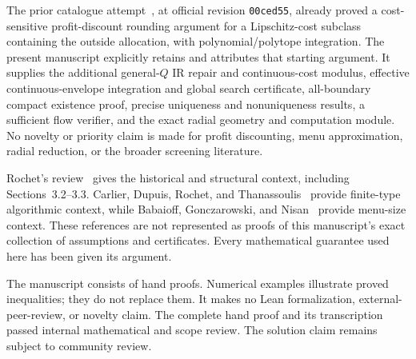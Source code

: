 \documentclass[11pt,a4paper]{article}
\numberwithin{equation}{section}
\begin{document}
The prior catalogue attempt~\cite{PriorAttempt}, at official revision
\texttt{00ced55}, already proved a cost-sensitive profit-discount
rounding argument for a Lipschitz-cost subclass containing the outside
allocation, with polynomial/polytope integration.
The present manuscript explicitly retains and attributes that starting
argument. It supplies the additional general-\(Q\) IR repair and
continuous-cost modulus, effective continuous-envelope integration and
global search certificate, all-boundary compact existence proof,
precise uniqueness and nonuniqueness results, a sufficient flow
verifier, and the exact radial geometry and computation module.
No novelty or priority claim is made for profit discounting, menu
approximation, radial reduction, or the broader screening literature.

Rochet's review~\cite{Rochet2024} gives the historical and structural
context, including Sections~3.2--3.3.
Carlier, Dupuis, Rochet, and Thanassoulis~\cite{CDRT2024} provide
finite-type algorithmic context, while
Babaioff, Gonczarowski, and Nisan~\cite{BGN} provide menu-size context.
These references are not represented as proofs of this manuscript's
exact collection of assumptions and certificates.
Every mathematical guarantee used here has been given its argument.

The manuscript consists of hand proofs. Numerical examples illustrate
proved inequalities; they do not replace them.
It makes no Lean formalization, external-peer-review, or novelty claim.
The complete hand proof and its transcription passed internal mathematical
and scope review. The solution claim remains subject to community review.
\end{document}

